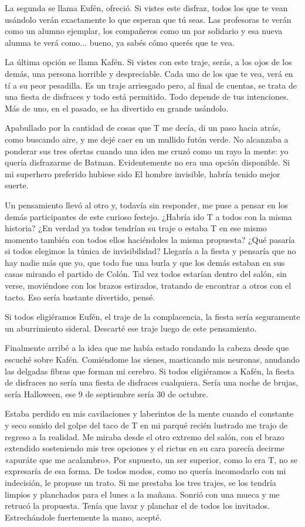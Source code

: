 \documentclass[11pt,twoside,openright,a5paper]{book}
\begin{document}
La segunda se llama Eufén, ofreció. Si vistes este disfraz, todos los que te vean usándolo verán exactamente lo que esperan que tú seas. Las profesoras te verán como un alumno ejemplar, los compañeros como un par solidario y esa nueva alumna te verá como... bueno, ya sabés cómo querés que te vea.

La última opción se llama Kafén. Si vistes con este traje, serás, a los ojos de los demás, una persona horrible y despreciable. Cada uno de los que te vea, verá en tí a su peor pesadilla. Es un traje arriesgado pero, al final de cuentas, se trata de una fiesta de disfraces y todo está permitido. Todo depende de tus intenciones. Más de uno, en el pasado, se ha divertido en grande usándolo.

Apabullado por la cantidad de cosas que T me decía, di un paso hacia atrás, como buscando aire, y me dejé caer en un mullido futón verde. No alcanzaba a ponderar sus tres ofertas cuando una idea me cruzó como un rayo la mente: yo quería disfrazarme de Batman. Evidentemente no era una opción disponible. Si mi superhero preferido hubiese sido El hombre invisible, habría tenido mejor suerte.

Un pensamiento llevó al otro y, todavía sin responder, me puse a pensar en los demás participantes de este curioso festejo. ¿Habría ido T a todos con la misma historia? ¿En verdad ya todos tendrían su traje o estaba T en ese mismo momento también con todos ellos haciéndoles la misma propuesta? ¿Qué pasaría si todos elegimos la túnica de invisibilidad? Llegaría a la fiesta y pensaría que no hay nadie más que yo, que todo fue una burla y que los demás estaban en sus casas mirando el partido de Colón. Tal vez todos estarían dentro del salón, sin verse, moviéndose con los brazos estirados, tratando de encontrar a otros con el tacto. Eso sería bastante divertido, pensé.

Si todos eligiéramos Eufén, el traje de la complacencia, la fiesta sería seguramente un aburrimiento sideral. Descarté ese traje luego de este pensamiento.

Finalmente arribé a la idea que me había estado rondando la cabeza desde que escuché sobre Kafén. Comiéndome las sienes, masticando mis neuronas, anudando las delgadas fibras que forman mi cerebro. Si todos eligiéramos a Kafén, la fiesta de disfraces no sería una fiesta de disfraces cualquiera. Sería una noche de brujas, sería Halloween, ese 9 de septiembre sería 30 de octubre.

Estaba perdido en mis cavilaciones y laberintos de la mente cuando el constante y seco sonido del golpe del taco de T en mi parqué recién lustrado me trajo de regreso a la realidad. Me miraba desde el otro extremo del salón, con el brazo extendido sosteniendo mis tres opciones y el rictus en su cara parecía decirme «apuráte que me acalambro». Por supuesto, un ser superior, como lo era T, no se expresaría de esa forma. De todos modos, como no quería incomodarlo con mi indecisión, le propuse un trato. Si me prestaba los tres trajes, se los tendría limpios y planchados para el lunes a la mañana. Sonrió con una mueca y me retrucó la propuesta. Tenía que lavar y planchar el de todos los invitados. Estrechándole fuertemente la mano, acepté.
\end{document}
